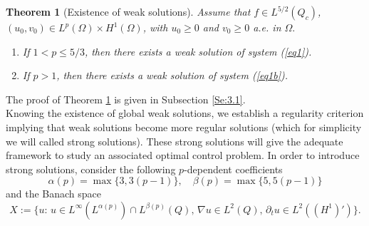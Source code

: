 \documentclass[11pt,reqno]{amsart}%
\newtheorem{theorem}{Theorem}[section]
\newtheorem{definition}[theorem]{Definition}
\newtheorem{remark}{Remark}[section]
\numberwithin{equation}{section}
\begin{document}
\begin{theorem}[Existence of weak solutions]\label{teo1} 
Assume that  $f\in L^{5/2}(Q_c)$, $(u_0,v_0)\in L^{p}(\Omega)\times H^{1}(\Omega)$, with
$u_0\ge0$ and $v_0\ge 0$ a.e. in $\Omega.$ 
\begin{enumerate} \item If $1<p\le 5/3$, then there exists a weak solution of system (\ref{eq1}).
\item If $p>1$, then there exists a weak solution of system (\ref{eq1b}).
\end{enumerate}
\end{theorem}
The proof of Theorem \ref{teo1} is given in Subsection \ref{Se:3.1}.\\


%


Knowing the existence of global weak solutions, we establish a regularity criterion 
implying that weak solutions  
 become more regular solutions (which for simplicity we will called strong solutions). These strong solutions will give the adequate framework to study  an associated optimal control problem. In order to introduce strong solutions,  consider the following $p$-dependent coefficients
$$\alpha(p)=\max\{3,3(p-1)\},
\quad 
\beta(p)=\max\{5,5(p-1)\}$$
and the Banach space
  \begin{equation} \label{xu}
X:=\{u: \, u \in L^{\infty}(L^{\alpha(p)}) \cap L^{\beta(p)}(Q), \, \nabla u \in L^{2}(Q), \, 
\partial_t u \in L^{2}((H^{1})') \}.
\end{equation}
\end{document}
